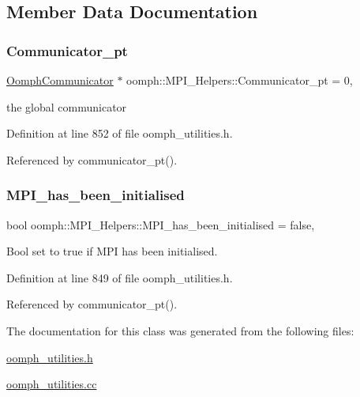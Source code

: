 \subsection{Member Data Documentation}
\mbox{\label{classoomph_1_1MPI__Helpers_a78e44036f7979616432483c805e2c93c}} 
\subsubsection{\texorpdfstring{Communicator\+\_\+pt}{Communicator\_pt}}
{\footnotesize\ttfamily \hyperlink{classoomph_1_1OomphCommunicator}{Oomph\+Communicator} $\ast$ oomph\+::\+M\+P\+I\+\_\+\+Helpers\+::\+Communicator\+\_\+pt = 0\hspace{0.3cm}{\ttfamily [static]}, {\ttfamily [private]}}



the global communicator 



Definition at line 852 of file oomph\+\_\+utilities.\+h.



Referenced by communicator\+\_\+pt().

\mbox{\label{classoomph_1_1MPI__Helpers_aa8d80db3f7a06074ff4a92e3bb4ab91d}} 
\subsubsection{\texorpdfstring{M\+P\+I\+\_\+has\+\_\+been\+\_\+initialised}{MPI\_has\_been\_initialised}}
{\footnotesize\ttfamily bool oomph\+::\+M\+P\+I\+\_\+\+Helpers\+::\+M\+P\+I\+\_\+has\+\_\+been\+\_\+initialised = false\hspace{0.3cm}{\ttfamily [static]}, {\ttfamily [private]}}



Bool set to true if M\+PI has been initialised. 



Definition at line 849 of file oomph\+\_\+utilities.\+h.



Referenced by communicator\+\_\+pt().



The documentation for this class was generated from the following files\+:\begin{DoxyCompactItemize}
\item 
\hyperlink{oomph__utilities_8h}{oomph\+\_\+utilities.\+h}\item 
\hyperlink{oomph__utilities_8cc}{oomph\+\_\+utilities.\+cc}\end{DoxyCompactItemize}
